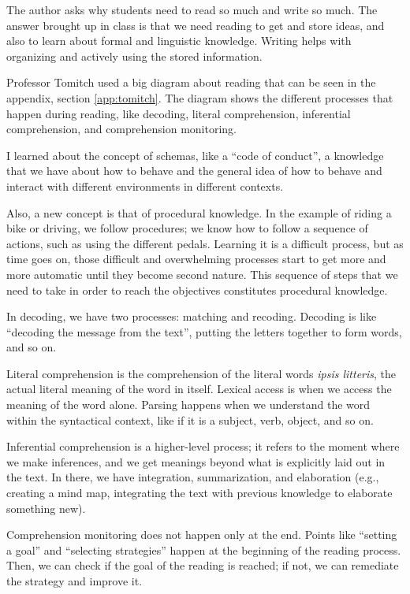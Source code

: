 The author asks why students need to read so much and write so much. The answer brought up in class is that we need reading to get and store ideas, and also to learn about formal and linguistic knowledge. Writing helps with organizing and actively using the stored information.

Professor Tomitch used a big diagram about reading that can be seen in the appendix, section \ref{app:tomitch}. The diagram shows the different processes that happen during reading, like decoding, literal comprehension, inferential comprehension, and comprehension monitoring.

I learned about the concept of schemas, like a ``code of conduct'', a knowledge that we have about how to behave and the general idea of how to behave and interact with different environments in different contexts.

Also, a new concept is that of procedural knowledge. In the example of riding a bike or driving, we follow procedures; we know how to follow a sequence of actions, such as using the different pedals. Learning it is a difficult process, but as time goes on, those difficult and overwhelming processes start to get more and more automatic until they become second nature. This sequence of steps that we need to take in order to reach the objectives constitutes procedural knowledge.

In decoding, we have two processes: matching and recoding. Decoding is like ``decoding the message from the text'', putting the letters together to form words, and so on.

Literal comprehension is the comprehension of the literal words \textit{ipsis litteris}, the actual literal meaning of the word in itself. Lexical access is when we access the meaning of the word alone. Parsing happens when we understand the word within the syntactical context, like if it is a subject, verb, object, and so on.

Inferential comprehension is a higher-level process; it refers to the moment where we make inferences, and we get meanings beyond what is explicitly laid out in the text. In there, we have integration, summarization, and elaboration (e.g., creating a mind map, integrating the text with previous knowledge to elaborate something new).

Comprehension monitoring does not happen only at the end. Points like ``setting a goal'' and ``selecting strategies'' happen at the beginning of the reading process. Then, we can check if the goal of the reading is reached; if not, we can remediate the strategy and improve it.

